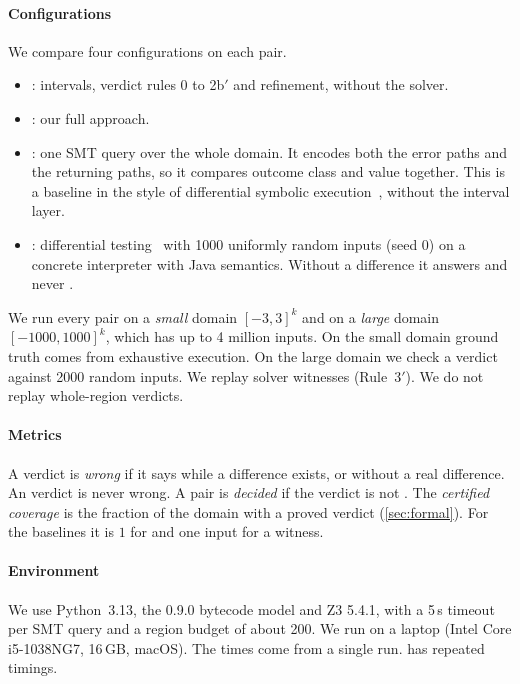 \paragraph{Configurations}
We compare four configurations on each pair.
\begin{itemize}
  \item {}: intervals, verdict rules 0 to 2b$'$ and refinement, without the solver.
  \item {}: our full approach.
  \item {}: one SMT query over the whole domain. It encodes both the error paths
        and the returning paths, so it compares outcome class and value together. This is a
        baseline in the style of differential symbolic execution~\citep{person2008dse},
        without the interval layer.
  \item {}: differential testing~\citep{mckeeman1998differential} with 1000
        uniformly random inputs (seed 0) on a concrete interpreter with Java 
        semantics. Without a difference it answers \unk{} and never \pres{}.
\end{itemize}
We run every pair on a \emph{small} domain $[-3,3]^k$ and on a \emph{large} domain
$[-1000,1000]^k$, which has up to 4 million inputs. On the small domain ground truth comes
from exhaustive execution. On the large domain we check a \pres{} verdict against 2000 random
inputs. We replay solver witnesses (Rule~3$'$). We do not replay whole-region \chg{} verdicts.

\paragraph{Metrics}
A verdict is \emph{wrong} if it says \pres{} while a difference exists, or \chg{} without a
real difference. An \unk{} verdict is never wrong. A pair is \emph{decided} if the verdict is
not \unk{}. The \emph{certified coverage} is the fraction of the domain with a proved verdict
(\cref{sec:formal}). For the baselines it is $1$ for \pres{} and one input for a witness.

\paragraph{Environment}
We use Python~3.13, the \jpamb{} 0.9.0 bytecode model and Z3 5.4.1, with a 5\,s timeout per
SMT query and a region budget of about 200. We run on a laptop (Intel Core i5-1038NG7, 16\,GB,
macOS). The times come from a single run.  has repeated timings.

